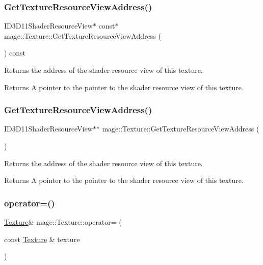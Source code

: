 \subsubsection{\texorpdfstring{Get\+Texture\+Resource\+View\+Address()}{GetTextureResourceViewAddress()}\hspace{0.1cm}{\footnotesize\ttfamily [1/2]}}
{\footnotesize\ttfamily I\+D3\+D11\+Shader\+Resource\+View$\ast$ const$\ast$ mage\+::\+Texture\+::\+Get\+Texture\+Resource\+View\+Address (\begin{DoxyParamCaption}{ }\end{DoxyParamCaption}) const}

Returns the address of the shader resource view of this texture.

\begin{DoxyReturn}{Returns}
A pointer to the pointer to the shader resource view of this texture. 
\end{DoxyReturn}
\hypertarget{classmage_1_1_texture_a322ee2751dbd9ccfb245c6d481dfc803}{}\label{classmage_1_1_texture_a322ee2751dbd9ccfb245c6d481dfc803} 
\subsubsection{\texorpdfstring{Get\+Texture\+Resource\+View\+Address()}{GetTextureResourceViewAddress()}\hspace{0.1cm}{\footnotesize\ttfamily [2/2]}}
{\footnotesize\ttfamily I\+D3\+D11\+Shader\+Resource\+View$\ast$$\ast$ mage\+::\+Texture\+::\+Get\+Texture\+Resource\+View\+Address (\begin{DoxyParamCaption}{ }\end{DoxyParamCaption})}

Returns the address of the shader resource view of this texture.

\begin{DoxyReturn}{Returns}
A pointer to the pointer to the shader resource view of this texture. 
\end{DoxyReturn}
\hypertarget{classmage_1_1_texture_a0b73b4df98d729c8f60e58b0ca065636}{}\label{classmage_1_1_texture_a0b73b4df98d729c8f60e58b0ca065636} 
\subsubsection{\texorpdfstring{operator=()}{operator=()}\hspace{0.1cm}{\footnotesize\ttfamily [1/2]}}
{\footnotesize\ttfamily \hyperlink{classmage_1_1_texture}{Texture}\& mage\+::\+Texture\+::operator= (\begin{DoxyParamCaption}\item[{const \hyperlink{classmage_1_1_texture}{Texture} \&}]{texture }\end{DoxyParamCaption})\hspace{0.3cm}{\ttfamily [delete]}}

